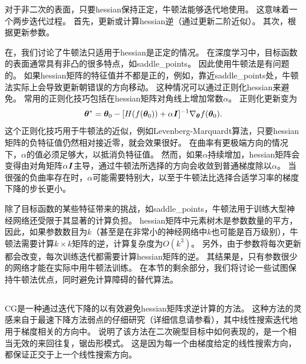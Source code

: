 对于非二次的表面，只要\gls{hessian}保持正定，牛顿法能够迭代地使用。
这意味着一个两步迭代过程。
首先，更新或计算\gls{hessian}逆（通过更新二阶近似）。
其次，根据更新参数。


在，我们讨论了牛顿法只适用于\gls{hessian}是正定的情况。
在深度学习中，目标函数的表面通常具有非凸的很多特点，如\gls{saddle_points}。
因此使用牛顿法是有问题的。
如果\gls{hessian}矩阵的特征值并不都是正的，例如，靠近\gls{saddle_points}处，牛顿法实际上会导致更新朝错误的方向移动。
这种情况可以通过正则化\gls{hessian}来避免。
常用的正则化技巧包括在\gls{hessian}矩阵对角线上增加常数$\alpha$。
正则化更新变为
\begin{equation}
    \boldsymbol{\theta}^* = \boldsymbol{\theta}_0 - [ H( f(\boldsymbol{\theta}_0)) + \alpha \boldsymbol{\mathit{I}}  ]^{-1} \nabla_{\boldsymbol{\theta}} f(\boldsymbol{\theta}_0).
\end{equation}
这个正则化技巧用于牛顿法的近似，例如Levenberg-Marquardt算法\citep{Levenberg44,Marquardt63}，只要\gls{hessian}矩阵的负特征值仍然相对接近零，就会效果很好。
在曲率有更极端方向的情况下，$\alpha$的值必须足够大，以抵消负特征值。
然而，如果$\alpha$持续增加，\gls{hessian}矩阵会变得由对角矩阵$\alpha \boldsymbol{\mathit{I}}$主导，通过牛顿法所选择的方向会收敛到普通梯度除以$\alpha$。
当很强的负曲率存在时，$\alpha$可能需要特别大，以至于牛顿法比选择合适学习率的梯度下降的步长更小。

除了目标函数的某些特征带来的挑战，如\gls{saddle_points}，牛顿法用于训练大型神经网络还受限于其显著的计算负担。
\gls{hessian}矩阵中元素树木是参数数量的平方，因此，如果参数数目为$k$（甚至是在非常小的神经网络中$k$也可能是百万级别），牛顿法需要计算$k\times k$矩阵的逆，计算复杂度为$O(k^3)$。
另外，由于参数将每次更新都会改变，每次训练迭代都需要计算\gls{hessian}矩阵的逆。
其结果是，只有参数很少的网络才能在实际中用牛顿法训练。
在本节的剩余部分，我们将讨论一些试图保持牛顿法优点，同时避免计算障碍的替代算法。

\subsection{}
\label{sec:conjugate_gradients}
\gls{CG}是一种通过迭代下降的以有效避免\gls{hessian}矩阵求逆计算的方法。
这种方法的灵感来自于最速下降方法弱点的仔细研究（详细信息请参看），其中线性搜索迭代地用于梯度相关的方向中。
说明了该方法在二次碗型目标中如何表现的，是一个相当无效的来回往复，锯齿形模式。
这是因为每一个由梯度给定的线性搜索方向，都保证正交于上一个线性搜索方向。

